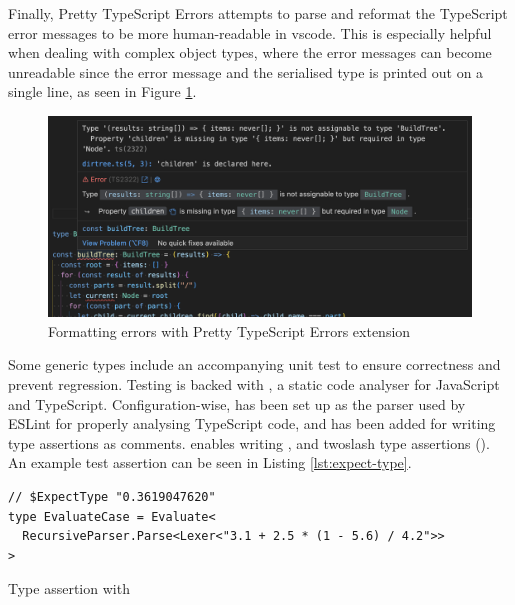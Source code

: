 Finally, Pretty TypeScript Errors \cite{balasianoPrettyTypeScriptErrors2023} attempts to parse and reformat the TypeScript error messages to be more human-readable in \acrshort{vscode}. This is especially helpful when dealing with complex object types, where the error messages can become unreadable since the error message and the serialised type is printed out on a single line, as seen in Figure \ref{fig:pretty-ts-errors}.


\begin{figure}[ht]
  \centering
  \includegraphics[width=\textwidth]{text/testing/pretty-ts-errors.png}
  \caption{Formatting errors with Pretty TypeScript Errors extension}
  \label{fig:pretty-ts-errors}
\end{figure}

Some generic types include an accompanying unit test to ensure correctness and prevent regression. Testing is backed with  \cite{ESLint2023}, a static code analyser for JavaScript and TypeScript. Configuration-wise,  has been set up as the parser used by ESLint for properly analysing TypeScript code, and  has been added for writing type assertions as comments.  enables writing ,  and twoslash type assertions (). An example test assertion can be seen in Listing \ref{lst:expect-type}.

\begin{listing}[ht]
  \begin{verbatim}
// $ExpectType "0.3619047620"
type EvaluateCase = Evaluate<
  RecursiveParser.Parse<Lexer<"3.1 + 2.5 * (1 - 5.6) / 4.2">>
>
\end{verbatim}
  \caption{Type assertion with }\label{lst:expect-type}
\end{listing}
